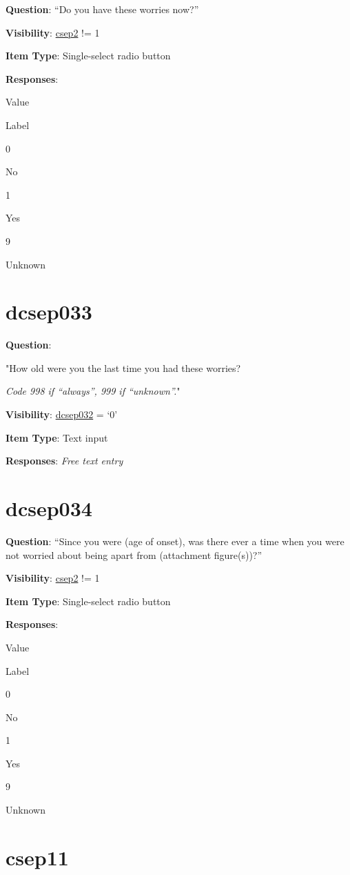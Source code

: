 \documentclass[]{book}
\begin{document}
\textbf{Question}: ``Do you have these worries now?''

\textbf{Visibility}: \protect\hyperlink{csep2}{csep2} != 1

\textbf{Item Type}: Single-select radio button

\textbf{Responses}:

Value

Label

0

No

1

Yes

9

Unknown

\hypertarget{dcsep033}{%
\section{dcsep033}\label{dcsep033}}

\textbf{Question}:

"How old were you the last time you had these worries?

\emph{Code 998 if ``always'', 999 if ``unknown''.}"

\textbf{Visibility}: \protect\hyperlink{dcsep032}{dcsep032} = `0'

\textbf{Item Type}: Text input

\textbf{Responses}: \emph{Free text entry}

\hypertarget{dcsep034}{%
\section{dcsep034}\label{dcsep034}}

\textbf{Question}: ``Since you were (age of onset), was there ever a time when you were not worried about being apart from (attachment figure(s))?''

\textbf{Visibility}: \protect\hyperlink{csep2}{csep2} != 1

\textbf{Item Type}: Single-select radio button

\textbf{Responses}:

Value

Label

0

No

1

Yes

9

Unknown

\hypertarget{csep11}{%
\section{csep11}\label{csep11}}
\end{document}
